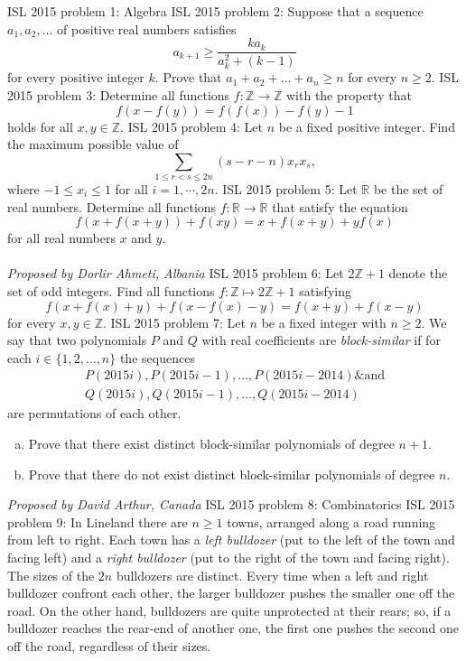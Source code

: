 ISL 2015 problem 1:  Algebra 
ISL 2015 problem 2:  Suppose that a sequence $a_1,a_2,\ldots$ of positive real numbers satisfies
\[ a_{k+1}\geq\frac{ka_k}{a_k^2+(k-1)} \]
for every positive integer $k$. Prove that $a_1+a_2+\ldots+a_n\geq n$ for every $n\geq2$. 
ISL 2015 problem 3:  Determine all functions $f:\mathbb{Z}\rightarrow\mathbb{Z}$ with the property that
\[ f(x-f(y))=f(f(x))-f(y)-1 \]
holds for all $x,y\in\mathbb{Z}$. 
ISL 2015 problem 4:  Let $n$ be a fixed positive integer. Find the maximum possible value of
\[ \sum_{1 \le r < s \le 2n} (s-r-n)x_rx_s, \]
where $-1 \le x_i \le 1$ for all $i = 1, \cdots , 2n$. 
ISL 2015 problem 5:  Let $\mathbb R$ be the set of real numbers. Determine all functions $f:\mathbb R\to\mathbb R$ that satisfy the equation
\[ f(x+f(x+y))+f(xy)=x+f(x+y)+yf(x) \]
for all real numbers $x$ and $y$. \\\\
\textit{Proposed by Dorlir Ahmeti, Albania} 
ISL 2015 problem 6:  Let $2\mathbb{Z} + 1$ denote the set of odd integers. Find all functions $f:\mathbb{Z} \mapsto 2\mathbb{Z} + 1$ satisfying
\[ f(x + f(x) + y) + f(x - f(x) - y) = f(x+y) + f(x-y) \]
for every $x, y \in \mathbb{Z}$. 
ISL 2015 problem 7:  Let $n$ be a fixed integer with $n \ge 2$. We say that two polynomials $P$ and $Q$ with real coefficients are \textit{block-similar} if for each $i \in \{1, 2, \ldots, n\}$ the sequences
\begin{eqnarray*}
P(2015i), P(2015i - 1), \ldots, P(2015i - 2014) \& \text{and}\\
Q(2015i), Q(2015i - 1), \ldots, Q(2015i - 2014)
\end{eqnarray*}
are permutations of each other.
\begin{enumerate}[(a)]
  \item Prove that there exist distinct block-similar polynomials of degree $n + 1$.
  \item Prove that there do not exist distinct block-similar polynomials of degree $n$.
\end{enumerate}
\textit{Proposed by David Arthur, Canada} 
ISL 2015 problem 8:  Combinatorics 
ISL 2015 problem 9:  In Lineland there are $n\geq1$ towns, arranged along a road running from left to right. Each town has a \textit{left bulldozer} (put to the left of the town and facing left) and a \textit{right bulldozer} (put to the right of the town and facing right). The sizes of the $2n$ bulldozers are distinct. Every time when a left and right bulldozer confront each other, the larger bulldozer pushes the smaller one off the road. On the other hand, bulldozers are quite unprotected at their rears; so, if a bulldozer reaches the rear-end of another one, the first one pushes the second one off the road, regardless of their sizes. \\\\
